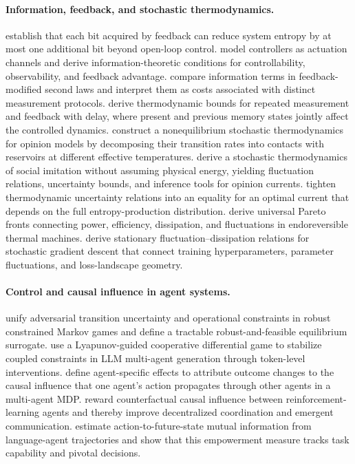 \paragraph{Information, feedback, and stochastic thermodynamics.}
\citet{touchette2000limits} establish that each bit acquired by feedback can reduce system entropy by at most one additional bit beyond open-loop control.
\citet{touchette2004approach} model controllers as actuation channels and derive information-theoretic conditions for controllability, observability, and feedback advantage.
\citet{horowitz2014second} compare information terms in feedback-modified second laws and interpret them as costs associated with distinct measurement protocols.
\citet{kwon2016feedback} derive thermodynamic bounds for repeated measurement and feedback with delay, where present and previous memory states jointly affect the controlled dynamics.
\citet{tome2023opinion} construct a nonequilibrium stochastic thermodynamics for opinion models by decomposing their transition rates into contacts with reservoirs at different effective temperatures.
\citet{irisarri2026stochastic} derive a stochastic thermodynamics of social imitation without assuming physical energy, yielding fluctuation relations, uncertainty bounds, and inference tools for opinion currents.
\citet{ray2023uncertainty} tighten thermodynamic uncertainty relations into an equality for an optimal current that depends on the full entropy-production distribution.
\citet{almanza2026pareto} derive universal Pareto fronts connecting power, efficiency, dissipation, and fluctuations in endoreversible thermal machines.
\citet{yaida2019fluctuation} derive stationary fluctuation--dissipation relations for stochastic gradient descent that connect training hyperparameters, parameter fluctuations, and loss-landscape geometry.

\paragraph{Control and causal influence in agent systems.}
\citet{chang2026robust} unify adversarial transition uncertainty and operational constraints in robust constrained Markov games and define a tractable robust-and-feasible equilibrium surrogate.
\citet{xu2026lyapunov} use a Lyapunov-guided cooperative differential game to stabilize coupled constraints in LLM multi-agent generation through token-level interventions.
\citet{triantafyllou2024agent} define agent-specific effects to attribute outcome changes to the causal influence that one agent's action propagates through other agents in a multi-agent MDP.
\citet{jaques2019social} reward counterfactual causal influence between reinforcement-learning agents and thereby improve decentralized coordination and emergent communication.
\citet{song2026empowerment} estimate action-to-future-state mutual information from language-agent trajectories and show that this empowerment measure tracks task capability and pivotal decisions.


